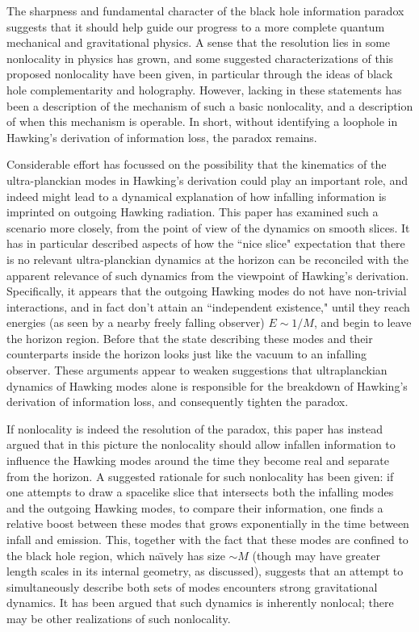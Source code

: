 
The sharpness and fundamental character  of the black hole information paradox suggests that it should help guide our progress to a more complete quantum mechanical and gravitational physics.  A sense that the resolution lies in some nonlocality in physics has grown, and some suggested characterizations of this proposed nonlocality have been given, in particular through the ideas of black hole complementarity and holography.  However, lacking in these statements has been a description of the mechanism of such a basic nonlocality, and a description of when this mechanism is operable.  In short, without identifying a  loophole in Hawking's derivation of information loss, the paradox remains.

Considerable effort has focussed on the possibility that the kinematics of the ultra-planckian modes in Hawking's derivation could play an important role, and indeed might lead to a dynamical explanation of how infalling information is imprinted on outgoing Hawking radiation.  This paper has examined such a scenario more closely, from the point of view of the dynamics on smooth slices.  It has in particular described aspects of how the ``nice slice" expectation that there is no relevant ultra-planckian dynamics at the horizon can be reconciled with the apparent relevance of such dynamics from the viewpoint of Hawking's derivation.  Specifically, it appears that the outgoing Hawking modes do not have non-trivial interactions, and in fact don't attain an ``independent existence," until they reach energies (as seen by a nearby freely falling observer) $E\sim 1/M$, and begin to leave the horizon region.  Before that the state describing these modes and their counterparts inside the horizon looks just like the vacuum to an infalling observer.  These arguments appear to weaken  suggestions that ultraplanckian dynamics of Hawking modes alone is responsible for the breakdown of Hawking's derivation of information loss, and consequently tighten the paradox.

If nonlocality is indeed the resolution of the paradox, this paper has instead argued that in this picture the nonlocality should allow infallen information to influence the Hawking modes around the time they become real and separate from the horizon.  A suggested rationale for such nonlocality has been given:  if one attempts to draw  a spacelike slice that intersects both the  infalling modes and the outgoing Hawking modes, to compare their information, one finds a relative boost between these modes that grows exponentially in the time between infall and emission.  This, together with the fact that these modes are confined to the black hole region, which na\"\i vely has size $\sim M$ (though may have greater length scales in its internal geometry, as discussed), suggests that an attempt to simultaneously describe both sets of modes encounters strong gravitational dynamics.  It has been argued that such dynamics is inherently nonlocal; there may be other realizations of such nonlocality.


